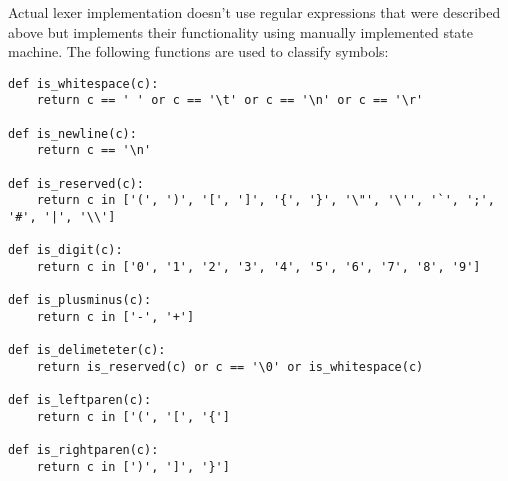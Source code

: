 Actual lexer implementation doesn't use regular expressions that were described above but implements their functionality using manually implemented state machine. The following functions are used to classify symbols:

\begin{lstlisting}
def is_whitespace(c):
    return c == ' ' or c == '\t' or c == '\n' or c == '\r'

def is_newline(c):
    return c == '\n'

def is_reserved(c): 
    return c in ['(', ')', '[', ']', '{', '}', '\"', '\'', '`', ';', '#', '|', '\\']

def is_digit(c):
    return c in ['0', '1', '2', '3', '4', '5', '6', '7', '8', '9']

def is_plusminus(c):
    return c in ['-', '+']

def is_delimeteter(c):
    return is_reserved(c) or c == '\0' or is_whitespace(c)

def is_leftparen(c):
	return c in ['(', '[', '{']

def is_rightparen(c):
	return c in [')', ']', '}']

\end{lstlisting}


